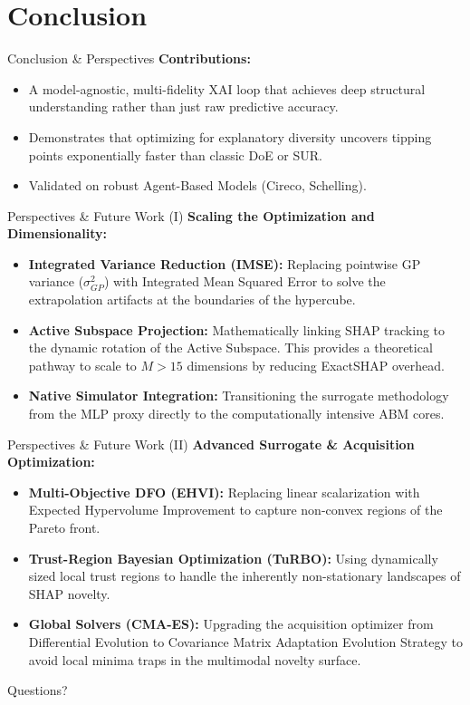 \documentclass[10pt, aspectratio=169]{beamer}
\begin{document}
\section{Conclusion}

\begin{frame}{Conclusion \& Perspectives}
  \textbf{Contributions:}
  \begin{itemize}
      \item A model-agnostic, multi-fidelity XAI loop that achieves deep structural understanding rather than just raw predictive accuracy.
      \item Demonstrates that optimizing for explanatory diversity uncovers tipping points exponentially faster than classic DoE or SUR.
      \item Validated on robust Agent-Based Models (Cireco, Schelling).
  \end{itemize}
\end{frame}
  
\begin{frame}{Perspectives \& Future Work (I)}
  \textbf{Scaling the Optimization and Dimensionality:}
  \begin{itemize}
      \item \textbf{Integrated Variance Reduction (IMSE):} Replacing pointwise GP variance ($\sigma^2_{GP}$) with Integrated Mean Squared Error to solve the extrapolation artifacts at the boundaries of the hypercube.
      \item \textbf{Active Subspace Projection:} Mathematically linking SHAP tracking to the dynamic rotation of the Active Subspace. This provides a theoretical pathway to scale to $M > 15$ dimensions by reducing ExactSHAP overhead.
      \item \textbf{Native Simulator Integration:} Transitioning the surrogate methodology from the MLP proxy directly to the computationally intensive ABM cores.
  \end{itemize}
\end{frame}

\begin{frame}{Perspectives \& Future Work (II)}
  \textbf{Advanced Surrogate \& Acquisition Optimization:}
  \begin{itemize}
      \item \textbf{Multi-Objective DFO (EHVI):} Replacing linear scalarization with Expected Hypervolume Improvement to capture non-convex regions of the Pareto front.
      \item \textbf{Trust-Region Bayesian Optimization (TuRBO):} Using dynamically sized local trust regions to handle the inherently non-stationary landscapes of SHAP novelty.
      \item \textbf{Global Solvers (CMA-ES):} Upgrading the acquisition optimizer from Differential Evolution to Covariance Matrix Adaptation Evolution Strategy to avoid local minima traps in the multimodal novelty surface.
  \end{itemize}
\end{frame}

\begin{frame}[standout]
  Questions?
\end{frame}
\end{document}
